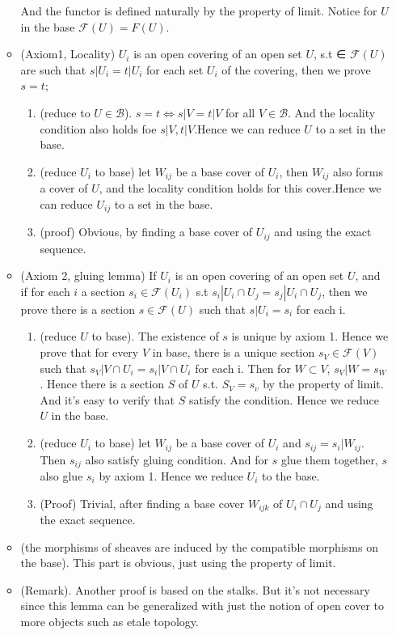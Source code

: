 \documentclass[12pt]{article}
\begin{document}
\begin{itemize}
\begin{itemize}
    And the functor is defined naturally by the property of limit. Notice for $U$ in the base $\mathcal{F}(U)=F(U)$.
  \item (Axiom1, Locality) $U_i$ is an open covering of an open set $U$, s.t ∈ $\mathcal{F}(U)$ are such that $s|U_i = t|U_i$ for each set $U_i$ of the covering, then we prove $s = t$;
    \begin{enumerate}
    \item (reduce to $U\in \mathcal{B}$). $s=t \Leftrightarrow s|V=t|V$ for all $V \in \mathcal{B}$. And the locality condition also holds foe $s|V, t|V$.Hence we can reduce $U$ to a set in the base.
    \item(reduce $U_i$ to base) let $W_{ij}$ be a base cover of $U_i$, then $W_{ij}$ also forms a cover of $U$, and the locality condition holds for this cover.Hence we can reduce $U_{ij}$ to a set in the base.
    \item(proof) Obvious, by finding a base cover of $U_{ij}$ and using the exact sequence.
    \end{enumerate}
  \item (Axiom 2, gluing lemma) If $U_i$ is an open covering of an open set $U$, and if for each $i$ a section $s_i \in \mathcal{F}(U_i)$ s.t $s_i|U_i\cap U_j = s_j|U_i\cap U_j$, then we prove there is a section $s \in \mathcal{F}(U)$ such that $s|U_i = s_i$ for each i. 
    \begin{enumerate}
    \item (reduce $U$ to base). The existence of $s$ is unique by axiom 1. Hence we prove that for every $V$ in base, there is a unique section $s_V \in \mathcal{F}(V)$ such that $s_V|V\cap U_i = s_i|V\cap U_i$ for each i. Then for $W \subset V$, $s_V|W=s_W$. Hence there is a section $S$ of $U$ s.t. $S_V=s_v$ by the property of limit. And it's easy to verify that $S$ satisfy the condition. Hence we reduce $U$ in the base.
    \item (reduce $U_i$ to base) let $W_{ij}$ be a base cover of $U_{i}$ and $s_{ij}=s_i|W_{ij}$. Then $s_{ij}$ also satisfy gluing condition. And for $s$ glue them together, $s$ also glue $s_i$ by axiom 1. Hence we reduce $U_i$ to the base.
    \item (Proof) Trivial, after finding a base cover $W_{ijk}$ of $U_i\cap U_j$ and using the exact sequence.
    \end{enumerate}
  \item (the morphisms of sheaves are induced by the compatible morphisms on the base). This part is obvious, just using the property of limit. 
  \item(Remark). Another proof is based on the stalks. But it's not necessary since this lemma can be generalized with just the notion of open cover to more objects such as etale topology. 
  \end{itemize}



\end{itemize}
\end{document}
